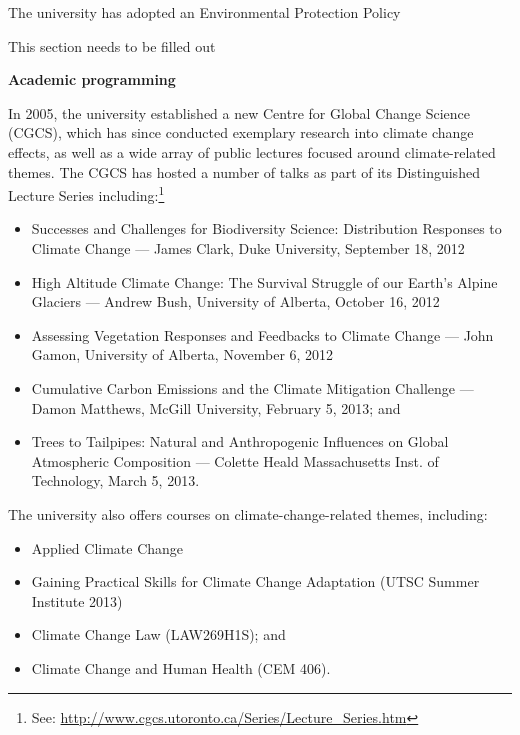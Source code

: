The university has adopted an Environmental Protection Policy

\begin{vcom}
	This section needs to be filled out
\end{vcom}




\textbf{Academic programming}



In 2005, the university established a new Centre for Global Change Science (CGCS), which has since conducted exemplary research into climate change effects, as well as a wide array of public lectures focused around climate-related themes. The CGCS has hosted a number of talks as part of its Distinguished Lecture Series including:\footnote{See: \url{http://www.cgcs.utoronto.ca/Series/Lecture_Series.htm}}
\begin{itemize}
	\item Successes and Challenges for Biodiversity Science: Distribution Responses to Climate Change --- James Clark, Duke University, September 18, 2012
	\item High Altitude Climate Change: The Survival Struggle of our Earth’s Alpine Glaciers --- Andrew Bush, University of Alberta, October 16, 2012 
	\item Assessing Vegetation Responses and Feedbacks to Climate Change --- John Gamon, University of Alberta, November 6, 2012
	\item Cumulative Carbon Emissions and the Climate Mitigation Challenge --- Damon Matthews, McGill University, February 5, 2013; and
	\item Trees to Tailpipes: Natural and Anthropogenic Influences on Global Atmospheric Composition --- Colette Heald Massachusetts Inst. of Technology, March 5, 2013.
\end{itemize}



The university also offers courses on climate-change-related themes, including:
\begin{itemize}
	\item Applied Climate Change
	\item Gaining Practical Skills for Climate Change Adaptation (UTSC Summer Institute 2013)
	\item Climate Change Law (LAW269H1S); and
	\item Climate Change and Human Health (CEM 406).
\end{itemize}




